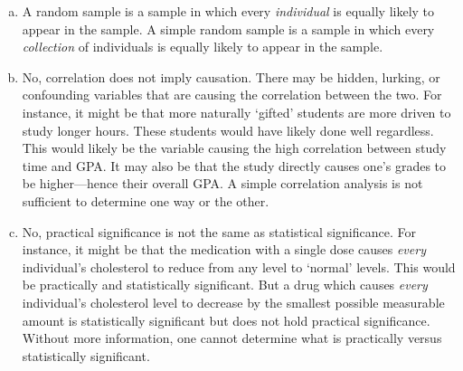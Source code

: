 \documentclass[11pt,letterpaper]{article}
\begin{document}
\sol 
\begin{enumerate}[(a)]
\item A random sample is a sample in which every \textit{individual} is equally likely to appear in the sample. A simple random sample is a sample in which every \textit{collection} of individuals is equally likely to appear in the sample. \pspace

\item No, correlation does not imply causation. There may be hidden, lurking, or confounding variables that are causing the correlation between the two. For instance, it might be that more naturally `gifted' students are more driven to study longer hours. These students would have likely done well regardless. This would likely be the variable causing the high correlation between study time and GPA. It may also be that the study directly causes one's grades to be higher---hence their overall GPA. A simple correlation analysis is not sufficient to determine one way or the other. \pspace

\item No, practical significance is not the same as statistical significance. For instance, it might be that the medication with a single dose causes \textit{every} individual's cholesterol to reduce from any level to `normal' levels. This would be practically and statistically significant. But a drug which causes \textit{every} individual's cholesterol level to decrease by the smallest possible measurable amount is statistically significant but does not hold practical significance. Without more information, one cannot determine what is practically versus statistically significant. 
\end{enumerate}
\end{document}

